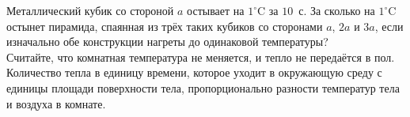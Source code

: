 Металлический кубик со стороной $a$ остывает на $1^\circ$C за $10$~с. За сколько на $1^\circ$C остынет пирамида, спаянная из трёх таких кубиков со сторонами $a$, $2a$ и $3a$, если изначально обе конструкции нагреты до одинаковой температуры?\\
Считайте, что комнатная температура не меняется, и тепло не передаётся в пол. Количество тепла в единицу времени, которое уходит в окружающую среду с единицы площади поверхности тела, пропорционально разности температур тела и воздуха в комнате.
